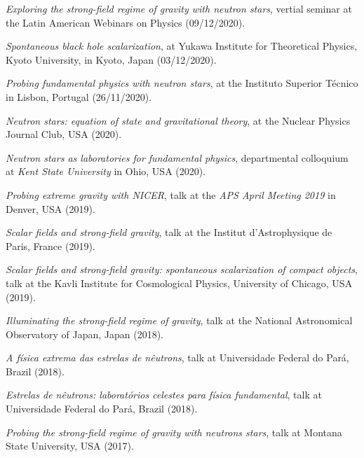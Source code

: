 \documentclass[11pt]{article}
\begin{document}
\begin{etaremune}[topsep=0pt,partopsep=0pt]
    \item
    \emph{Exploring the strong-field regime of gravity with neutron stars},
    vertial seminar at the Latin American Webinars on Physics (09/12/2020).

    \item
    \emph{Spontaneous black hole scalarization},
    at Yukawa Institute for Theoretical Physics, Kyoto University,
    in Kyoto, Japan (03/12/2020).

    \item
    \emph{Probing fundamental physics with neutron stars},
    at the Instituto Superior T\'ecnico
    in Lisbon, Portugal (26/11/2020).

    \item
    \emph{Neutron stars: equation of state and gravitational theory},
    at the Nuclear Physics Journal Club, USA (2020).

    \item
    \emph{Neutron stars as laboratories for fundamental physics},
    departmental colloquium at \emph{Kent State University}
    in Ohio, USA (2020).

    \item
    \emph{Probing extreme gravity with NICER},
    talk at the \emph{APS April Meeting 2019}
    in Denver, USA (2019).

    \item
    \emph{Scalar fields and strong-field gravity},
    talk at the Institut d'Astrophysique de Paris, France (2019).

	\item
    \emph{Scalar fields and strong-field gravity: spontaneous scalarization of compact objects},
    talk at the Kavli Institute for Cosmological Physics, University of Chicago, USA (2019).

	\item
    \emph{Illuminating the strong-field regime of gravity},
    talk at the National Astronomical Observatory of Japan, Japan (2018).

    \item
    \emph{A f\'isica extrema das estrelas de n\^eutrons},
    talk at Universidade Federal do Par\'a, Brazil (2018).

    \item
    \emph{Estrelas de n\^eutrons: laborat\'orios celestes para f\'isica fundamental},
    talk at Universidade Federal do Par\'a, Brazil (2018).

    \item
    \emph{Probing the strong-field regime of gravity with neutrons stars},
    talk at Montana State University, USA (2017).


\end{etaremune}
\end{document}
